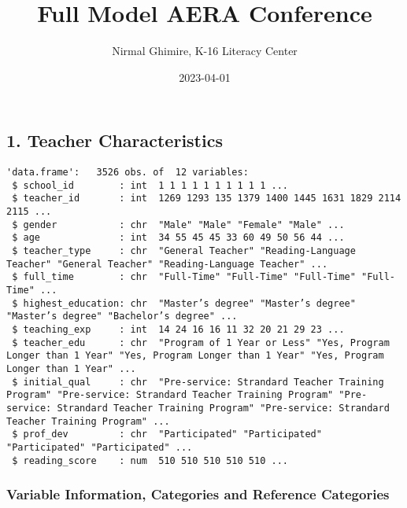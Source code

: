 \documentclass[
]{article}
\title{Full Model AERA Conference}
\author{Nirmal Ghimire, K-16 Literacy Center}
\date{2023-04-01}
\begin{document}
\maketitle

{
\setcounter{tocdepth}{2}
\tableofcontents
}
\hypertarget{teacher-characteristics}{%
\subsection{1. Teacher Characteristics}\label{teacher-characteristics}}

\begin{verbatim}
'data.frame':   3526 obs. of  12 variables:
 $ school_id        : int  1 1 1 1 1 1 1 1 1 1 ...
 $ teacher_id       : int  1269 1293 135 1379 1400 1445 1631 1829 2114 2115 ...
 $ gender           : chr  "Male" "Male" "Female" "Male" ...
 $ age              : int  34 55 45 45 33 60 49 50 56 44 ...
 $ teacher_type     : chr  "General Teacher" "Reading-Language Teacher" "General Teacher" "Reading-Language Teacher" ...
 $ full_time        : chr  "Full-Time" "Full-Time" "Full-Time" "Full-Time" ...
 $ highest_education: chr  "Master’s degree" "Master’s degree" "Master’s degree" "Bachelor’s degree" ...
 $ teaching_exp     : int  14 24 16 16 11 32 20 21 29 23 ...
 $ teacher_edu      : chr  "Program of 1 Year or Less" "Yes, Program Longer than 1 Year" "Yes, Program Longer than 1 Year" "Yes, Program Longer than 1 Year" ...
 $ initial_qual     : chr  "Pre-service: Strandard Teacher Training Program" "Pre-service: Strandard Teacher Training Program" "Pre-service: Strandard Teacher Training Program" "Pre-service: Strandard Teacher Training Program" ...
 $ prof_dev         : chr  "Participated" "Participated" "Participated" "Participated" ...
 $ reading_score    : num  510 510 510 510 510 ...
\end{verbatim}

\hypertarget{variable-information-categories-and-reference-categories}{%
\subsubsection{Variable Information, Categories and Reference
Categories}\label{variable-information-categories-and-reference-categories}}
\end{document}
